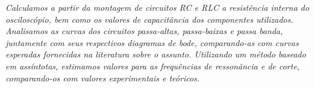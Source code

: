 \textit{Calculamos a partir da montagem de circuitos RC e RLC a resistência interna do osciloscópio, bem como os valores de capacitância dos componentes utilizados. Analisamos as curvas dos circuitos passa-altas, passa-baixas e passa banda, juntamente com seus respectivos diagramas de bode, comparando-as com curvas esperadas fornecidas na literatura sobre o assunto. Utilizando um método baseado em assíntotas, estimamos valores para as frequências de ressonância e de corte, comparando-os com valores experimentais e teóricos.}

